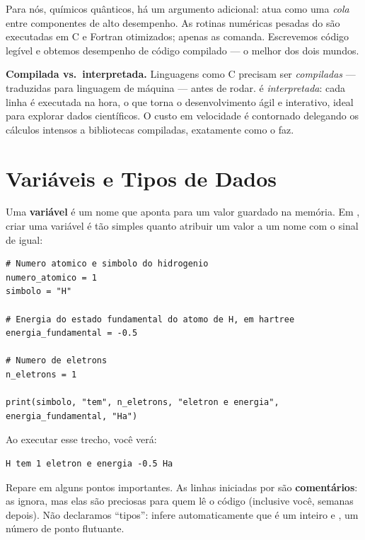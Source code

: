 Para nós, químicos quânticos, há um argumento adicional: \python{} atua como uma
\emph{cola} entre componentes de alto desempenho. As rotinas numéricas pesadas
do \pyscf{} são executadas em C e Fortran otimizados; \python{} apenas as comanda.
Escrevemos código legível e obtemos desempenho de código compilado --- o melhor
dos dois mundos.

\begin{caixanota}
\textbf{Compilada vs.\ interpretada.} Linguagens como C precisam ser
\emph{compiladas} --- traduzidas para linguagem de máquina --- antes de rodar.
\python{} é \emph{interpretada}: cada linha é executada na hora, o que torna o
desenvolvimento ágil e interativo, ideal para explorar dados científicos. O
custo em velocidade é contornado delegando os cálculos intensos a bibliotecas
compiladas, exatamente como o \pyscf{} faz.
\end{caixanota}

\section{Variáveis e Tipos de Dados}
\label{sec:variaveis}

Uma \textbf{variável} é um nome que aponta para um valor guardado na memória. Em
\python{}, criar uma variável é tão simples quanto atribuir um valor a um nome com
o sinal de igual:

\begin{lstlisting}[style=python,caption={Primeiras variáveis: dados de um átomo de hidrogênio.},label={lst:varsH}]
# Numero atomico e simbolo do hidrogenio
numero_atomico = 1
simbolo = "H"

# Energia do estado fundamental do atomo de H, em hartree
energia_fundamental = -0.5

# Numero de eletrons
n_eletrons = 1

print(simbolo, "tem", n_eletrons, "eletron e energia", energia_fundamental, "Ha")
\end{lstlisting}

\noindent
Ao executar esse trecho, você verá:

\begin{lstlisting}[style=console]
H tem 1 eletron e energia -0.5 Ha
\end{lstlisting}

\noindent
Repare em alguns pontos importantes. As linhas iniciadas por \code{\#} são
\textbf{comentários}: \python{} as ignora, mas elas são preciosas para quem lê o
código (inclusive você, semanas depois). Não declaramos ``tipos'': \python{}
infere automaticamente que  é um inteiro e
, um número de ponto flutuante.


